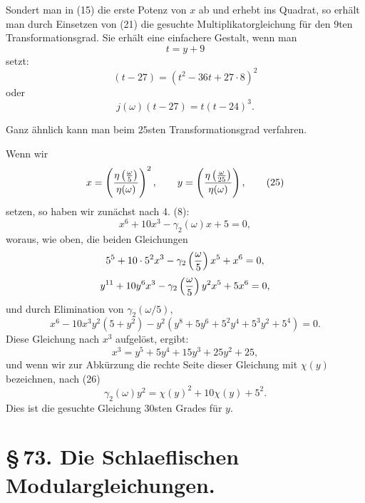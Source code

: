 \documentclass[11pt]{article}
\begin{document}
Sondert man in (15) die erste Potenz von $x$ ab und erhebt ins Quadrat, so erhält man durch Einsetzen von (21) die gesuchte Multiplikatorgleichung für den $9$ten Transformationsgrad. Sie erhält eine einfachere Gestalt, wenn man
\begin{equation}
 t=y+9
\tag{22}
\end{equation}
setzt:
\begin{equation}
 [j(\omega)-27\cdot64](t-27)=(t^2-36t+27\cdot8)^2
\tag{23}
\end{equation}
oder
\begin{equation}
 j(\omega)(t-27)=t(t-24)^3.
\tag{24}
\end{equation}

Ganz ähnlich kann man beim $25$sten Transformationsgrad verfahren.

Wenn wir
\begin{equation}
 x=\left({\eta\left({\omega\over5}\right)\over\eta(\omega)}\right)^2,
 \qquad
 y=\left({\eta\left({\omega\over25}\right)\over\eta(\omega)}\right),
\tag{25}
\end{equation}
setzen, so haben wir zunächst nach 4. (8):
\begin{equation}
 x^6+10x^3-\gamma_2(\omega)x+5=0,
\tag{26}
\end{equation}
woraus, wie oben, die beiden Gleichungen
\[
 5^5+10\cdot5^2x^3-\gamma_2\left({\omega\over5}\right)x^5+x^6=0,
\]
\[
 y^{11}+10y^6x^3-\gamma_2\left({\omega\over5}\right)y^2x^5+5x^6=0,
\]
und durch Elimination von $\gamma_2(\omega/5)$,
\[
 x^6-10x^3y^2(5+y^2)-y^2(y^8+5y^6+5^2y^4+5^3y^2+5^4)=0.
\]
Diese Gleichung nach $x^3$ aufgelöst, ergibt:
\begin{equation}
 x^3=y^5+5y^4+15y^3+25y^2+25,
\tag{27}
\end{equation}
und wenn wir zur Abkürzung die rechte Seite dieser Gleichung mit $\chi(y)$ bezeichnen, nach (26)
\begin{equation}
 \gamma_2(\omega)y^2=\chi(y)^2+10\chi(y)+5^2.
\tag{28}
\end{equation}
Dies ist die gesuchte Gleichung $30$sten Grades für $y$.


\clearpage
\section*{\S\,73. Die Schlaeflischen Modulargleichungen.}
\end{document}
